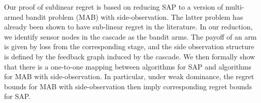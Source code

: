 Our proof of sublinear regret is based on reducing SAP to a version of multi-armed bandit problem (MAB) with side-observation. The latter problem has already been shown to have sub-linear regret in the literature. In our reduction, we identify sensor nodes in the cascade as the bandit arms. %
The payoff of an arm is given by loss from the corresponding stage, and the side observation structure is defined by the feedback graph induced by the cascade. We then formally show that there is a one-to-one mapping between algorithms for SAP and algorithms for MAB with side-observation. In particular, under weak dominance, the regret bounds for MAB with side-observation then imply corresponding regret bounds for SAP. 







